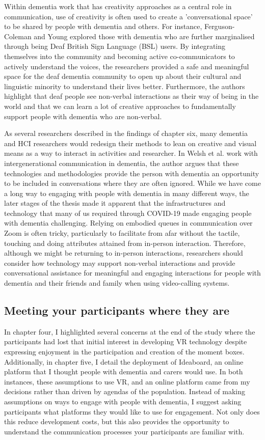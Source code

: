 Within dementia work that has creativity approaches as a central role in communication, use of creativity is often used to create a 'conversational space' to be shared by people with dementia and others. For instance, Ferguson-Coleman and Young explored those with dementia who are further marginalised through being Deaf British Sign Language (BSL) users. By integrating themselves into the community and becoming active co-communicators to actively understand the voices, the researchers provided a safe and meaningful space for the deaf dementia community to open up about their cultural and linguistic minority to understand their lives better. Furthermore, the authors highlight that deaf people see non-verbal interactions as their way of being in the world and that we can learn a lot of creative approaches to fundamentally support people with dementia who are non-verbal.

As several researchers described in the findings of chapter six, many dementia and HCI researchers would redesign their methods to lean on creative and visual means as a way to interact in activities and researcher. In Welsh et al. work with intergenerational communication in dementia, the author argues that these technologies and methodologies provide the person with dementia an opportunity to be included in conversations where they are often ignored. While we have come a long way to engaging with people with dementia in many different ways, the later stages of the thesis made it apparent that the infrastructures and technology that many of us required through COVID-19 made engaging people with dementia challenging. Relying on embodied queues in communication over Zoom is often tricky, particularly to facilitate from afar without the tactile, touching and doing attributes attained from in-person interaction. Therefore, although we might be returning to in-person interactions, researchers should consider how technology may support non-verbal interactions and provide conversational assistance for meaningful and engaging interactions for people with dementia and their friends and family when using video-calling systems.



\subsection{Meeting your participants where they are}
\label{Discussion:WhereTheyAre}
In chapter four, I highlighted several concerns at the end of the study where the participants had lost that initial interest in developing VR technology despite expressing enjoyment in the participation and creation of the moment boxes. Additionally, in chapter five, I detail the deployment of Ideaboard, an online platform that I thought people with dementia and carers would use. In both instances, these assumptions to use VR, and an online platform came from my decisions rather than driven by agendas of the population. Instead of making assumptions on ways to engage with people with dementia, I suggest asking participants what platforms they would like to use for engagement. Not only does this reduce development costs, but this also provides the opportunity to understand the communication processes your participants are familiar with. 

